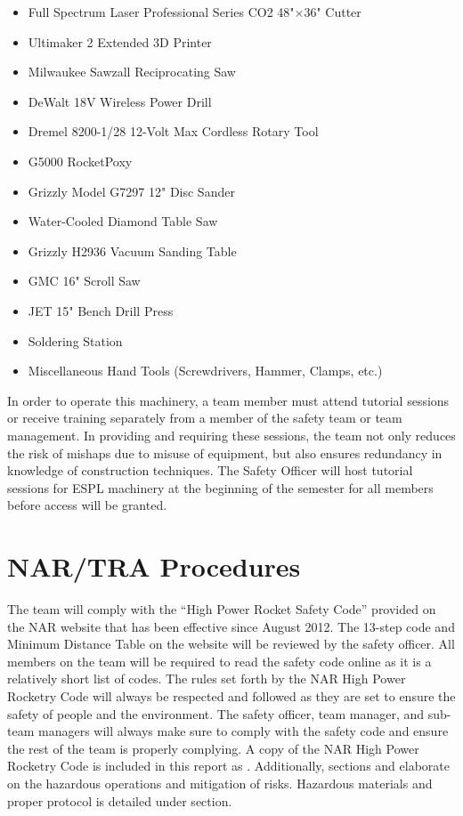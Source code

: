 \begin{itemize}[noitemsep]
    \item Full Spectrum Laser Professional Series CO2 48"$\times$36"  Cutter
    \item  Ultimaker 2 Extended 3D Printer
    \item Milwaukee Sawzall Reciprocating Saw
    \item DeWalt 18V Wireless Power Drill
    \item Dremel 8200-1/28 12-Volt Max Cordless Rotary Tool
    \item G5000 RocketPoxy
    \item Grizzly Model G7297 12" Disc Sander
    \item Water-Cooled Diamond Table Saw
    \item Grizzly H2936 Vacuum Sanding Table
    \item GMC 16" Scroll Saw
    \item JET 15" Bench Drill Press
    \item Soldering Station
    \item Miscellaneous Hand Tools (Screwdrivers, Hammer, Clamps, etc.)
\end{itemize}

In order to operate this machinery, a team member must attend tutorial sessions or receive training separately from a member of the safety team or team management. In providing and requiring these sessions, the team not only reduces the risk of mishaps due to misuse of equipment, but also ensures redundancy in knowledge of construction techniques. The Safety Officer will host tutorial sessions for ESPL machinery at the beginning of the semester for all members before access will be granted.

\section{NAR/TRA Procedures}

The team will comply with the ``High Power Rocket Safety Code'' provided on the NAR website that has been effective since August 2012. The 13-step code and Minimum Distance Table on the website will be reviewed by the safety officer. All members on the team will be required to read the safety code online as it is a relatively short list of codes. The rules set forth by the NAR High Power Rocketry Code will always be respected and followed as they are set to ensure the safety of people and the environment. The safety officer, team manager, and sub-team managers will always make sure to comply with the safety code and ensure the rest of the team is properly complying. A copy of the NAR High Power Rocketry Code is included in this report as . Additionally, sections  and  elaborate on the hazardous operations and mitigation of risks. Hazardous materials and proper protocol is detailed under section.

